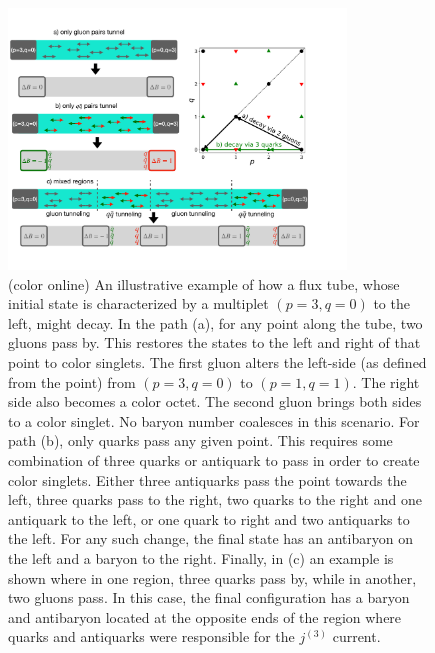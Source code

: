\documentclass[aps, prc, 12pt, nofootinbib, showpacs, superscriptaddress, tightenlines, groupedaddress]{revtex4-2}
\begin{document}
\begin{figure}
\centerline{\includegraphics[width=0.8\textwidth]{figs/2gluon.pdf}}
\caption{\label{fig:2gluon}(color online)
An illustrative example of how a flux tube, whose initial state is characterized by a multiplet $(p=3,q=0)$ to the left, might decay. In the path (a), for any point along the tube, two gluons pass by. This restores the states to the left and right of that point to color singlets. The first gluon alters the left-side (as defined from the point) from $(p=3,q=0)$ to $(p=1,q=1)$. The right side also becomes a color octet. The second gluon brings both sides to a color singlet. No baryon number coalesces in this scenario. For path (b), only quarks pass any given point. This requires some combination of three quarks or antiquark to pass in order to create color singlets. Either three antiquarks pass the point towards the left, three quarks pass to the right, two quarks to the right and one antiquark to the left, or one quark to right and two antiquarks to the left. For any such change, the final state has an antibaryon on the left and a baryon to the right. Finally, in (c) an example is shown where in one region, three quarks pass by, while in another, two gluons pass. In this case, the final configuration has a baryon and antibaryon located at the opposite ends of the region where quarks and antiquarks were responsible for the $j^{(3)}$ current.
}
\end{figure}
\end{document}

